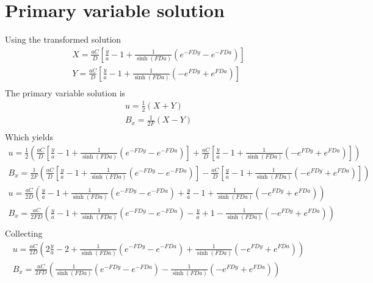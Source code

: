 \documentclass[11pt]{article}
\begin{document}
\section{Primary variable solution}
Using the transformed solution
\begin{equation}\begin{aligned}
	X = \frac{aC}{D} \left[ \frac{y}{a} - 1 + \frac{1}{\sinh(FD a)} \left(   e^{-FD y} - e^{-FD a} \right) \right] \\
	Y = \frac{aC}{D} \left[ \frac{y}{a} - 1 + \frac{1}{\sinh(FD a)} \left( - e^{ FD y} + e^{ FD a} \right) \right] \\
\end{aligned} \end{equation}
The primary variable solution is
\begin{equation}\begin{aligned}
u   = \frac{1}{2} \left( X + Y \right) \\
B_x = \frac{1}{2F} \left( X - Y \right) \\
\end{aligned} \end{equation}
Which yields
\begin{equation}\begin{aligned}
u   = \frac{1}{2}  \left( \frac{aC}{D} \left[ \frac{y}{a} - 1 + \frac{1}{\sinh(FD a)} \left(   e^{-FD y} - e^{-FD a} \right) \right] + \frac{aC}{D} \left[ \frac{y}{a} - 1 + \frac{1}{\sinh(FD a)} \left( - e^{ FD y} + e^{ FD a} \right) \right] \right) \\
B_x = \frac{1}{2F} \left( \frac{aC}{D} \left[ \frac{y}{a} - 1 + \frac{1}{\sinh(FD a)} \left(   e^{-FD y} - e^{-FD a} \right) \right] - \frac{aC}{D} \left[ \frac{y}{a} - 1 + \frac{1}{\sinh(FD a)} \left( - e^{ FD y} + e^{ FD a} \right) \right] \right) \\
u   = \frac{aC}{2D}  \left( \frac{y}{a} - 1 + \frac{1}{\sinh(FD a)} \left(   e^{-FD y} - e^{-FD a} \right) + \frac{y}{a} - 1 + \frac{1}{\sinh(FD a)} \left( - e^{ FD y} + e^{ FD a} \right) \right) \\
B_x = \frac{aC}{2FD} \left( \frac{y}{a} - 1 + \frac{1}{\sinh(FD a)} \left(   e^{-FD y} - e^{-FD a} \right) - \frac{y}{a} + 1 - \frac{1}{\sinh(FD a)} \left( - e^{ FD y} + e^{ FD a} \right) \right) \\
\end{aligned} \end{equation}
Collecting
\begin{equation}\begin{aligned}
u   = \frac{aC}{2D}  \left( 2\frac{y}{a} - 2 + \frac{1}{\sinh(FD a)} \left(   e^{-FD y} - e^{-FD a} \right) + \frac{1}{\sinh(FD a)} \left( - e^{ FD y} + e^{ FD a} \right) \right) \\
B_x = \frac{aC}{2FD} \left(\frac{1}{\sinh(FD a)} \left(   e^{-FD y} - e^{-FD a} \right) - \frac{1}{\sinh(FD a)} \left( - e^{ FD y} + e^{ FD a} \right) \right) \\
\end{aligned} \end{equation}
\end{document}
